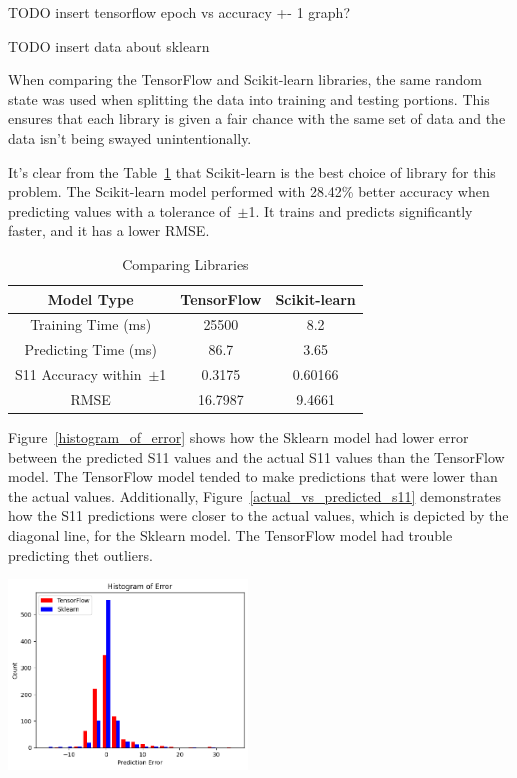 \documentclass[lettersize,journal]{IEEEtran}
\newenvironment{Figure}
    {\par\medskip\noindent\minipage{\linewidth}}
    {\endminipage\par\medskip}
\begin{document}
TODO insert tensorflow epoch vs accuracy +- 1 graph? 

TODO insert data about sklearn 

When comparing the TensorFlow and Scikit-learn libraries, the same random state was used when splitting the data into training and testing portions. This ensures that each library is given a fair chance with the same set of data and the data isn't being swayed unintentionally. 

It's clear from the Table~\ref{comparing_libraries} that Scikit-learn is the best choice of library for this problem. The Scikit-learn model performed with 28.42\% better accuracy when predicting values with a tolerance of~$\pm$1. It trains and predicts significantly faster, and it has a lower RMSE.

\begin{table}[h]
\caption{Comparing Libraries}
\begin{center}
\begin{tabular}{ |c|c|c| }
    \hline
    Model Type & TensorFlow & Scikit-learn \\ 
    \hline
    Training Time (ms) & 25500 & 8.2 \\  
    \hline
    Predicting Time (ms) & 86.7 & 3.65 \\
    \hline
    S11 Accuracy within~$\pm$1 & 0.3175 & 0.60166 \\
    \hline
    RMSE & 16.7987 & 9.4661 \\
    \hline
\end{tabular}
\end{center}
\label{comparing_libraries}
\end{table}

Figure~\ref{histogram_of_error} shows how the Sklearn model had lower error between the predicted S11 values and the actual S11 values than the TensorFlow model. The TensorFlow model tended to make predictions that were lower than the actual values. Additionally, Figure~\ref{actual_vs_predicted_s11} demonstrates how the S11 predictions were closer to the actual values, which is depicted by the diagonal line, for the Sklearn model. The TensorFlow model had trouble predicting thet outliers. 

\begin{Figure}
    \centering
    \includegraphics[width=2.5in]{histogram}
    \label{histogram_of_error}
\end{Figure}
\end{document}
